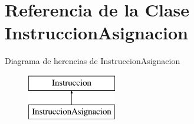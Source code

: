 \hypertarget{class_instruccion_asignacion}{\section{Referencia de la Clase Instruccion\-Asignacion}
\label{class_instruccion_asignacion}
}
Diagrama de herencias de Instruccion\-Asignacion\begin{figure}[H]
\begin{center}
\leavevmode
\includegraphics[height=2.000000cm]{class_instruccion_asignacion}
\end{center}
\end{figure}
